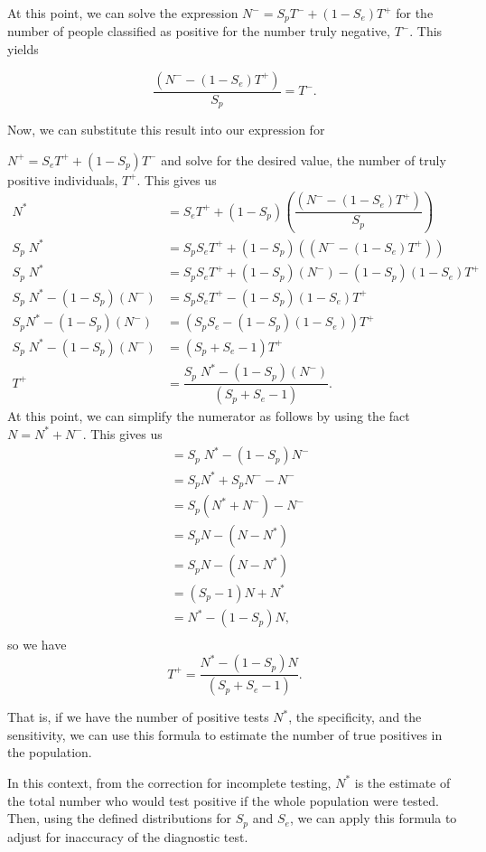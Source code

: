 \documentclass[12pt,twoside]{smiththesis}
\begin{document}
\noindent At this point, we can solve the expression \(N^- = S_p T^- + (1-S_e) T^+\) for the number of people classified as positive for the number truly negative, \(T^-\). This yields

\[\dfrac{( N^- - (1-S_e) T^+) }{S_p}=  T^- .\]

\noindent Now, we can substitute this result into our expression for

\(N^+ =S_e T^+ + (1-S_p) T^-\) and solve for the desired value, the number of truly positive individuals, \(T^+\). This gives us
\begin{align*}
 N^* &=S_e T^+ + (1-S_p)  \left( \dfrac{( N^- - (1-S_e) T^+) }{S_p} \right)
\\
 S_p \; N^* &=S_pS_e T^+ + (1-S_p)  \left( {( N^- - (1-S_e) T^+) } \right)
\\
 S_p \; N^* &=S_pS_e T^+ + (1-S_p)  ( N^-)  - (1-S_p)(1-S_e) T^+
\\
 S_p \; N^* -   (1-S_p)  ( N^-) &=S_pS_e T^+  - (1-S_p)(1-S_e) T^+
\\
 S_p N^* -   (1-S_p)  ( N^-) &= (S_pS_e  - (1-S_p)(1-S_e)) T^+
\\
 S_p \; N^* -   (1-S_p)  ( N^-) &= (S_p + S_e - 1) T^+
\\
 T^+ &= \dfrac{ S_p \; N^* -   (1-S_p)  ( N^-)}{(S_p + S_e - 1)} .
\end{align*}
At this point, we can simplify the numerator as follows by using the fact
\(N =N^* + N^-\). This gives us
\begin{align*} &=S_p \;N^* -   (1-S_p)  N^-\\
&=  S_p   N^* + S_p  N^- - N^-\\
&=  S_p(N^* +  N^-) - N^- \\
&=  S_pN - (N-N^*) \\
&=  S_pN - (N-N^*) \\
&=  (S_p-1)N + N^* \\
&=  N^* - (1-S_p)N,\\
\end{align*}
so we have
\[
 T^+ = \dfrac{ N^*- (1-S_p)N}{(S_p + S_e - 1)}.
\]

That is, if we have the number of positive tests \(N^*\), the specificity, and the sensitivity, we can use this formula to estimate the number of true positives in the population.

In this context, from the correction for incomplete testing, \(N^*\) is the estimate of the total number who would test positive if the whole population were tested. Then, using the defined distributions for \(S_p\) and \(S_e\), we can apply this formula to adjust for inaccuracy of the diagnostic test.
\end{document}
